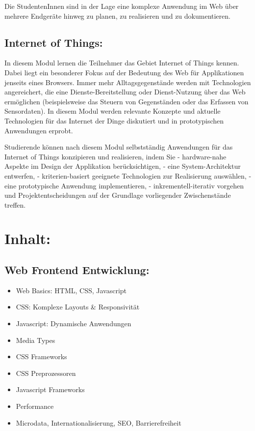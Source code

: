 Die StudentenInnen sind in der Lage eine komplexe Anwendung im Web über
mehrere Endgeräte hinweg zu planen, zu realisieren und zu dokumentieren.

\subsection{Internet of Things:}\label{internet-of-things}

In diesem Modul lernen die Teilnehmer das Gebiet Internet of Things
kennen. Dabei liegt ein besonderer Fokus auf der Bedeutung des Web für
Applikationen jenseits eines Browsers. Immer mehr Alltagsgegenstände
werden mit Technologien angereichert, die eine Dienste-Bereitstellung
oder Dienst-Nutzung über das Web ermöglichen (beispielsweise das Steuern
von Gegenständen oder das Erfassen von Sensordaten). In diesem Modul
werden relevante Konzepte und aktuelle Technologien für das Internet der
Dinge diskutiert und in prototypischen Anwendungen erprobt.

Studierende können nach diesem Modul selbstständig Anwendungen für das
Internet of Things konzipieren und realisieren, indem Sie -
hardware-nahe Aspekte im Design der Applikation berücksichtigen, - eine
System-Architektur entwerfen, - kriterien-basiert geeignete Technologien
zur Realisierung auswählen, - eine prototypische Anwendung
implementieren, - inkrementell-iterativ vorgehen und
Projektentscheidungen auf der Grundlage vorliegender Zwischenstände
treffen.

\section{Inhalt:}\label{inhalt-30}

\subsection{Web Frontend
Entwicklung:}\label{web-frontend-entwicklung-1}

\begin{itemize}
\tightlist
\item
  Web Basics: HTML, CSS, Javascript
\item
  CSS: Komplexe Layouts \& Responsivität
\item
  Javascript: Dynamische Anwendungen
\item
  Media Types
\item
  CSS Frameworks
\item
  CSS Preprozessoren
\item
  Javascript Frameworks
\item
  Performance
\item
  Microdata, Internationalisierung, SEO, Barrierefreiheit
\end{itemize}

